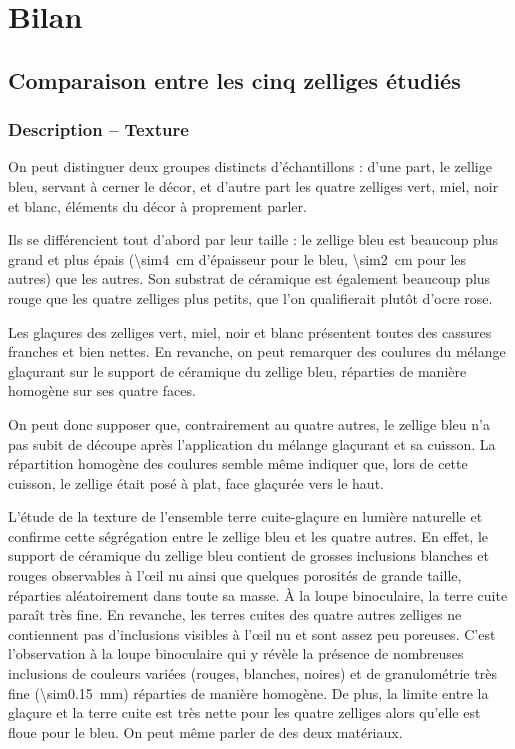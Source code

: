 
\chapter{Bilan}

\section{Comparaison entre les cinq zelliges étudiés}

\subsection{Description -- Texture}
On peut distinguer deux groupes distincts d'échantillons : d'une part, le zellige bleu,  servant à cerner le décor, et d'autre part les quatre zelliges vert, miel, noir et blanc, éléments du décor à proprement parler.

Ils se différencient tout d'abord par leur taille : le zellige bleu est beaucoup plus grand et plus épais (\SI{\sim4}{\cm} d'épaisseur pour le bleu, \SI{\sim2}{\cm} pour les autres) que les autres. Son substrat de céramique est également beaucoup plus rouge que les quatre zelliges plus petits, que l'on qualifierait plutôt d'ocre rose.

Les glaçures des zelliges vert, miel, noir et blanc présentent toutes des cassures franches et bien nettes. En revanche, on peut remarquer des coulures du mélange glaçurant sur le support de céramique du zellige bleu, réparties de manière homogène sur ses quatre faces.

On peut donc supposer que, contrairement au quatre autres, le zellige bleu n'a pas subit de découpe après l'application du mélange glaçurant et sa cuisson. La répartition homogène des coulures semble même indiquer que, lors de cette cuisson, le zellige était posé à plat, face glaçurée vers le haut.

L'étude de la texture de l'ensemble terre cuite-glaçure en lumière naturelle et \CL confirme cette ségrégation entre le zellige bleu et les quatre autres. En effet, le support de céramique du zellige bleu contient de grosses inclusions blanches et rouges observables à l'{\oe}il nu ainsi que quelques porosités de grande taille, réparties aléatoirement dans toute sa masse. À la loupe binoculaire, la terre cuite paraît très fine. En revanche, les terres cuites des quatre autres zelliges ne contiennent pas d'inclusions visibles à l'{\oe}il nu et sont assez peu poreuses. C'est l'observation à la loupe binoculaire qui y révèle la présence de nombreuses inclusions de couleurs variées (rouges, blanches, noires) et de granulométrie très fine (\SI{\sim0.15}{\mm}) réparties de manière homogène. De plus, la limite entre la glaçure et la terre cuite est très nette pour les quatre  zelliges alors qu'elle est floue pour le bleu. On peut même parler de  des deux matériaux.

